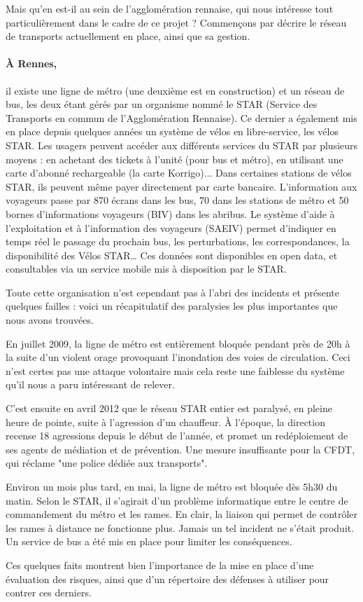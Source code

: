 	Mais qu'en est-il au sein de l'agglomération rennaise, qui nous intéresse tout particulièrement dans le cadre de ce projet ? Commençons par décrire le réseau de transports actuellement en place, ainsi que sa gestion.


	\paragraph{À Rennes,} il existe une ligne de métro (une deuxième est en construction) et un réseau de bus, les deux étant gérés par un organisme nommé le STAR (Service des Transports en commun de l'Agglomération Rennaise). Ce dernier a également mis en place depuis quelques années un système de vélos en libre-service, les vélos STAR. Les usagers peuvent accéder aux différents services du STAR par plusieurs moyens : en achetant des tickets à l'unité (pour bus et métro), en utilisant une carte d'abonné rechargeable (la carte Korrigo)... Dans certaines stations de vélos STAR, ils peuvent même payer directement par carte bancaire. L'information aux voyageurs passe par 870 écrans dans les bus, 70 dans les stations de métro et 50 bornes d’informations voyageurs (BIV) dans les abribus. Le système d’aide à l’exploitation et à l’information des voyageurs (SAEIV) permet d’indiquer en temps réel le passage du prochain bus, les perturbations, les correspondances, la disponibilité des Vélos STAR… Ces données sont disponibles en open data, et consultables via un service mobile mis à disposition par le STAR.

	Toute cette organisation n'est cependant pas à l'abri des incidents et présente quelques failles : voici un récapitulatif des paralysies les plus importantes que nous avons trouvées.

	En juillet 2009, la ligne de métro est entièrement bloquée pendant près de 20h à la suite d'un violent orage provoquant l'inondation des voies de circulation. Ceci n'est certes pas une attaque volontaire mais cela reste une faiblesse du système qu'il nous a paru intéressant de relever. 

	C'est ensuite en avril 2012 que le réseau STAR entier est paralysé, en pleine heure de pointe, suite à l'agression d'un chauffeur. À l'époque, la direction recense 18 agressions depuis le début de l'année, et promet un redéploiement de ses agents de médiation et de prévention. Une mesure insuffisante pour la CFDT, qui réclame "une police dédiée aux transports".

	Environ un mois plus tard, en mai, la ligne de métro est bloquée dès 5h30 du matin. Selon le STAR, il s’agirait d’un problème informatique entre le centre de commandement du métro et les rames. En clair, la liaison qui permet de contrôler les rames à distance ne fonctionne plus. Jamais un tel incident ne s’était produit. Un service de bus a été mis en place pour limiter les conséquences.

	Ces quelques faits montrent bien l'importance de la mise en place d'une évaluation des risques, ainsi que d'un répertoire des défenses à utiliser pour contrer ces derniers.
